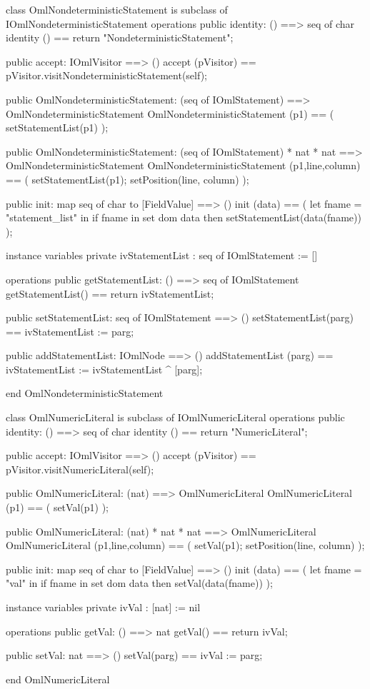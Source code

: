 \begin{vdm_al}
class OmlNondeterministicStatement is subclass of IOmlNondeterministicStatement
operations
  public identity: () ==> seq of char
  identity () == return "NondeterministicStatement";

  public accept: IOmlVisitor ==> ()
  accept (pVisitor) == pVisitor.visitNondeterministicStatement(self);

  public OmlNondeterministicStatement:
    (seq of IOmlStatement) ==> OmlNondeterministicStatement
  OmlNondeterministicStatement (p1) == 
    ( setStatementList(p1) );

  public OmlNondeterministicStatement:
    (seq of IOmlStatement) *
    nat *
    nat ==> OmlNondeterministicStatement
  OmlNondeterministicStatement (p1,line,column) == 
    ( setStatementList(p1);
      setPosition(line, column) );

  public init: map seq of char to [FieldValue] ==> ()
  init (data) ==
    ( let fname = "statement_list" in
        if fname in set dom data
        then setStatementList(data(fname)) );

instance variables
  private ivStatementList : seq of IOmlStatement := []

operations
  public getStatementList: () ==> seq of IOmlStatement
  getStatementList() == return ivStatementList;

  public setStatementList: seq of IOmlStatement ==> ()
  setStatementList(parg) == ivStatementList := parg;

  public addStatementList: IOmlNode ==> ()
  addStatementList (parg) == ivStatementList := ivStatementList ^ [parg];

end OmlNondeterministicStatement
\end{vdm_al}

\begin{vdm_al}
class OmlNumericLiteral is subclass of IOmlNumericLiteral
operations
  public identity: () ==> seq of char
  identity () == return "NumericLiteral";

  public accept: IOmlVisitor ==> ()
  accept (pVisitor) == pVisitor.visitNumericLiteral(self);

  public OmlNumericLiteral:
    (nat) ==> OmlNumericLiteral
  OmlNumericLiteral (p1) == 
    ( setVal(p1) );

  public OmlNumericLiteral:
    (nat) *
    nat *
    nat ==> OmlNumericLiteral
  OmlNumericLiteral (p1,line,column) == 
    ( setVal(p1);
      setPosition(line, column) );

  public init: map seq of char to [FieldValue] ==> ()
  init (data) ==
    ( let fname = "val" in
        if fname in set dom data
        then setVal(data(fname)) );

instance variables
  private ivVal : [nat] := nil

operations
  public getVal: () ==> nat
  getVal() == return ivVal;

  public setVal: nat ==> ()
  setVal(parg) == ivVal := parg;

end OmlNumericLiteral
\end{vdm_al}

